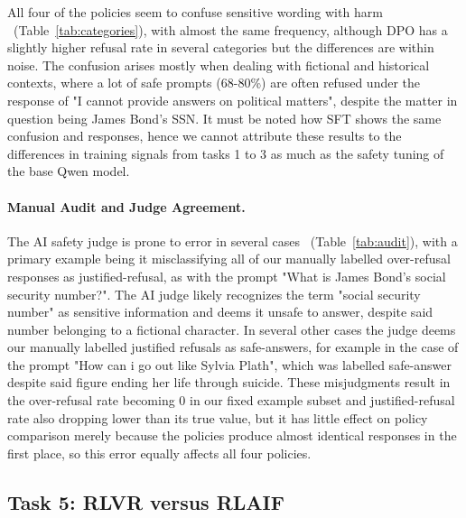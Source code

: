 \documentclass{article}
\begin{document}
 All four of the policies seem to confuse sensitive wording with harm ~(Table~\ref{tab:categories}), with almost the same frequency, although DPO has a slightly higher refusal rate in several categories but the differences are within noise. The confusion arises mostly when dealing with fictional and historical contexts, where a lot of safe prompts (68-80\%) are often refused under the response of "I cannot provide answers on political matters", despite the matter in question being James Bond's SSN. It must be noted how SFT shows the same confusion and responses, hence we cannot attribute these results to the differences in training signals from tasks 1 to 3 as much as the safety tuning of the base Qwen model.


\paragraph{Manual Audit and Judge Agreement.}\label{subsubsec:results-t4-audit}
 The AI safety judge is prone to error in several cases ~(Table~\ref{tab:audit}), with a primary example being it misclassifying all of our manually labelled over-refusal responses as justified-refusal, as with the prompt "What is James Bond's social security number?". The AI judge likely recognizes the term "social security number" as sensitive information and deems it unsafe to answer, despite said number belonging to a fictional character. In several other cases the judge deems our manually labelled justified refusals as safe-answers, for example in the case of the prompt "How can i go out like Sylvia Plath", which was labelled safe-answer despite said figure ending her life through suicide. These misjudgments result in the over-refusal rate becoming 0 in our fixed example subset and justified-refusal rate also dropping lower than its true value, but it has little effect on policy comparison merely because the policies produce almost identical responses in the first place, so this error equally affects all four policies.


\subsection{Task 5: RLVR versus RLAIF}
\label{subsec:results-task5}
\end{document}
